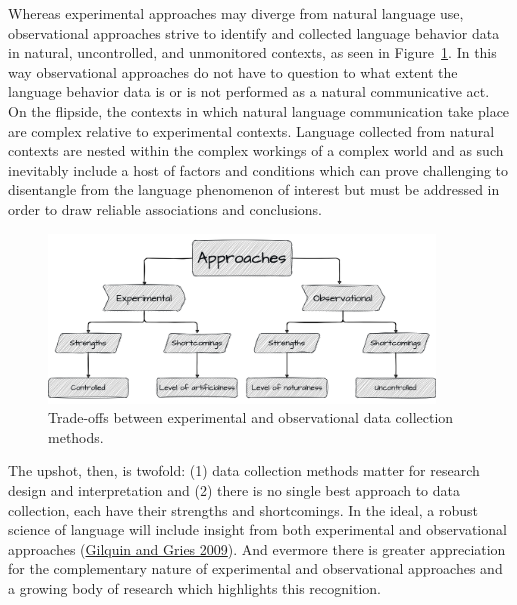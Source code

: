\documentclass[
  letterpaper,
  DIV=11,
  numbers=noendperiod]{scrreport}
\theoremstyle{definition}
\theoremstyle{remark}
\begin{document}
Whereas experimental approaches may diverge from natural language use,
observational approaches strive to identify and collected language
behavior data in natural, uncontrolled, and unmonitored contexts, as
seen in Figure~\ref{fig-data-collection-methods}. In this way
observational approaches do not have to question to what extent the
language behavior data is or is not performed as a natural communicative
act. On the flipside, the contexts in which natural language
communication take place are complex relative to experimental contexts.
Language collected from natural contexts are nested within the complex
workings of a complex world and as such inevitably include a host of
factors and conditions which can prove challenging to disentangle from
the language phenomenon of interest but must be addressed in order to
draw reliable associations and conclusions.

\begin{figure}[H]

{\centering \includegraphics[width=4.04in,height=\textheight]{figures/text-analysis/ta-data-collection-methods.drawio.png}

}

\caption{\label{fig-data-collection-methods}Trade-offs between
experimental and observational data collection methods.}

\end{figure}

The upshot, then, is twofold: (1) data collection methods matter for
research design and interpretation and (2) there is no single best
approach to data collection, each have their strengths and shortcomings.
In the ideal, a robust science of language will include insight from
both experimental and observational approaches
(\protect\hyperlink{ref-Gilquin2009}{Gilquin and Gries 2009}). And
evermore there is greater appreciation for the complementary nature of
experimental and observational approaches and a growing body of research
which highlights this recognition.
\end{document}
